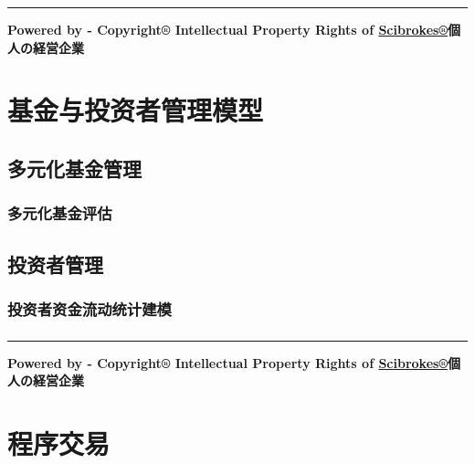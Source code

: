 \documentclass[]{book}
\theoremstyle{definition}
\theoremstyle{definition}
\theoremstyle{definition}
\theoremstyle{remark}
\begin{document}
\begin{center}\rule{0.5\linewidth}{\linethickness}\end{center}

\textbf{Powered by - Copyright® Intellectual Property Rights of
\href{http://www.scibrokes.com}{Scibrokes®}個人の経営企業}

\hypertarget{fund}{%
\chapter{基金与投资者管理模型}\label{fund}}

\section{多元化基金管理}

\subsection{多元化基金评估}

\hypertarget{section-2}{%
\subsection{}\label{section-2}}

\section{投资者管理}

\subsection{投资者资金流动统计建模}

\hypertarget{section-3}{%
\subsection{}\label{section-3}}

\begin{center}\rule{0.5\linewidth}{\linethickness}\end{center}

\textbf{Powered by - Copyright® Intellectual Property Rights of
\href{http://www.scibrokes.com}{Scibrokes®}個人の経営企業}

\hypertarget{algorithm}{%
\chapter{程序交易}\label{algorithm}}
\end{document}
